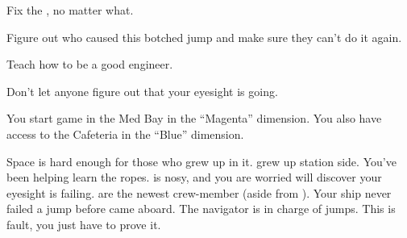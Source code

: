 \documentclass[char]{TMFHope}
\begin{document}
\begin{itemz}[Goals]
	\item Fix the \pNew{}, no matter what.
	\item Figure out who caused this botched jump and make sure they can't do it again.
	\item Teach \cBoy{} how to be a good engineer.
	\item Don't let anyone figure out that your eyesight is going.
\end{itemz}

\begin{itemz}[Notes]
	\item You start game in the Med Bay in the ``Magenta'' dimension. You also have access to the Cafeteria in the ``Blue'' dimension.
\end{itemz}

\begin{contacts}
	\contact{\cBoy{}} Space is hard enough for those who grew up in it. \cBoy{} grew up station side. You've been helping \cBoy{\them} learn the ropes.
	\contact{\cWeap{}} \cWeap{} is nosy, and you are worried \cWeap{\they} will discover your eyesight is failing.
	\contact{\cNav{}} \cNav{\They} are the newest crew-member (aside from \cBoy{}). Your ship never failed a jump before \cNav{\they} came aboard. The navigator is in charge of jumps. This is \cNav{\their} fault, you just have to prove it.
\end{contacts}
\end{document}
